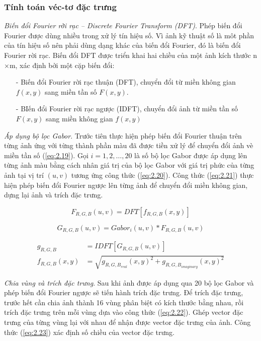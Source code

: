\subsubsection{Tính toán véc-tơ đặc trưng}
\emph{Biến đổi Fourier rời rạc  -- Discrete Fourier Transform (DFT)}.
Phép biến đổi Fourier được dùng nhiều trong xử lý tín hiệu số. Vì ảnh kỹ thuật số là môt phần của tín hiệu số nên phải dùng dạng khác của biến đổi Fourier, đó là biến đổi Fourier rời rạc. Biến đổi DFT được triển khai hai chiều của một ảnh kích thước n$\times$m, xác định bởi một cặp biến đổi:
\begin{itemize}
\item[-] Biến đổi Fourier rời rạc thuận (DFT), chuyển đổi từ miền không gian $f(x,y)$ sang miền tần số $F(x,y)$.
\item[-] BIến đổi Fourier rời rạc ngược (IDFT), chuyển đổi ảnh từ miền tần số $F(x,y)$ sang miền không gian $f(x,y)$
\end{itemize}

\emph{Áp dụng bộ lọc Gabor}.
Trước tiên thực hiện phép biến đổi Fourier thuận trên từng ảnh ứng với từng thành phần màu đã được tiền xử lý để chuyển đổi ảnh vè miền tần số (\ref{eq:2.19}). Gọi $i = 1, 2, \dots, 20$ là số bộ lọc Gabor được áp dụng lên từng ảnh màu bằng cách nhân giá trị của bộ lọc Gabor với giá trị phức của từng ảnh tại vị trí $(u,v)$ tương ứng công thức (\ref{eq:2.20}). Công thức (\ref{eq:2.21}) thực hiện phép biến đổi Fourier ngược lên từng ảnh để chuyển đổi miền không gian, dựng lại ảnh và trích đặc trưng. \par

\begin{equation}\label{eq:2.19}
F_{R, G, B}(u, v) = DFT[f_{R, G, B}(x,y)]
\end{equation}

\begin{equation}\label{eq:2.20}
G_{R, G, B}(u,v) = Gabor_i(u, v) * F_{R, G, B}(u, v)
\end{equation}

\begin{equation}\label{eq:2.21}
\begin{split}
g_{R, G, B} &= IDFT[G_{R, G, B}(u,v)]\\
f_{R, G, B}(x, y) & = \sqrt{g_{R, G, B_{real}}(x, y)^2 + g_{R, G, B_{imaginary}}(x, y)^2}
\end{split}
\end{equation}


\emph{Chia vùng và trích đặc trưng}. 
Sau khi ảnh được áp dụng qua 20 bộ lọc Gabor và phép biến đổi Fourier ngược sẽ tiến hành trích đặc trưng. Để trích đặc trưng, trước hết cần chia ảnh thành 16 vùng phân biệt có kích thước bằng nhau, rồi trích đặc trưng trên mỗi vùng dựa vào công thức (\ref{eq:2.22}). Ghép vector đặc trưng của từng vùng lại với nhau để nhận được vector đặc trưng của ảnh. Công thức (\ref{eq:2.23}) xác định số chiều của vector đặc trưng.

